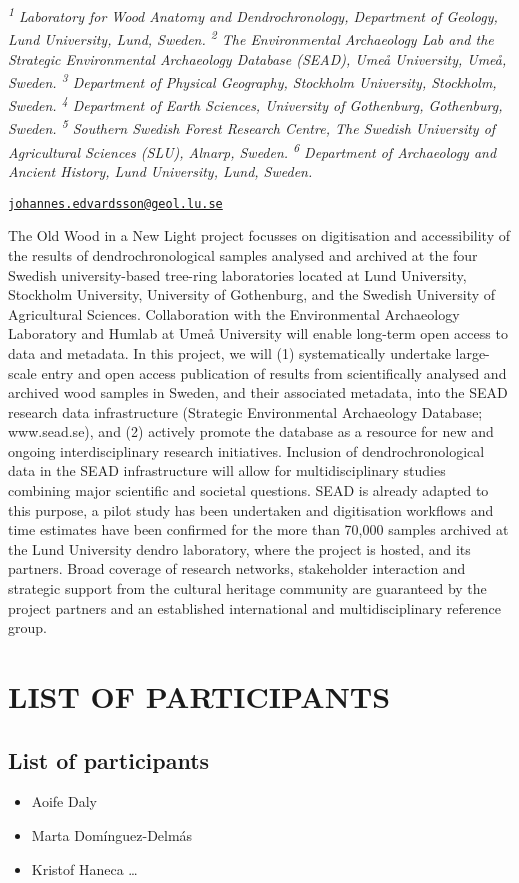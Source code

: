 \documentclass[
]{book}
\providecommand{\tightlist}{%
  \setlength{\itemsep}{0pt}\setlength{\parskip}{0pt}}
\begin{document}
\emph{\textsuperscript{1} Laboratory for Wood Anatomy and Dendrochronology, Department of Geology, Lund University, Lund, Sweden. \textsuperscript{2} The Environmental Archaeology Lab and the Strategic Environmental Archaeology Database (SEAD), Umeå University, Umeå, Sweden. \textsuperscript{3} Department of Physical Geography, Stockholm University, Stockholm, Sweden. \textsuperscript{4} Department of Earth Sciences, University of Gothenburg, Gothenburg, Sweden. \textsuperscript{5} Southern Swedish Forest Research Centre, The Swedish University of Agricultural Sciences (SLU), Alnarp, Sweden. \textsuperscript{6} Department of Archaeology and Ancient History, Lund University, Lund, Sweden.}

\href{mailto:johannes.edvardsson@geol.lu.se}{\nolinkurl{johannes.edvardsson@geol.lu.se}}

The Old Wood in a New Light project focusses on digitisation and accessibility of the results of dendrochronological samples analysed and archived at the four Swedish university-based tree-ring laboratories located at Lund University, Stockholm University, University of Gothenburg, and the Swedish University of Agricultural Sciences. Collaboration with the Environmental Archaeology Laboratory and Humlab at Umeå University will enable long-term open access to data and metadata. In this project, we will (1) systematically undertake large-scale entry and open access publication of results from scientifically analysed and archived wood samples in Sweden, and their associated metadata, into the SEAD research data infrastructure (Strategic Environmental Archaeology Database; www.sead.se), and (2) actively promote the database as a resource for new and ongoing interdisciplinary research initiatives. Inclusion of dendrochronological data in the SEAD infrastructure will allow for multidisciplinary studies combining major scientific and societal questions. SEAD is already adapted to this purpose, a pilot study has been undertaken and digitisation workflows and time estimates have been confirmed for the more than 70,000 samples archived at the Lund University dendro laboratory, where the project is hosted, and its partners. Broad coverage of research networks, stakeholder interaction and strategic support from the cultural heritage community are guaranteed by the project partners and an established international and multidisciplinary reference group.

\hypertarget{part-list-of-participants}{%
\part*{LIST OF PARTICIPANTS}\label{part-list-of-participants}}

\hypertarget{list-of-participants}{%
\chapter*{List of participants}\label{list-of-participants}}

\begin{itemize}
\tightlist
\item
  Aoife Daly
\item
  Marta Domínguez-Delmás
\item
  Kristof Haneca \ldots{}
\end{itemize}
\end{document}
